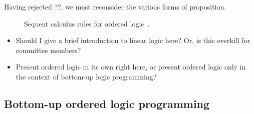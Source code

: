 Having rejected {??}, we must reconsider the various forms of proposition.


\begin{figure}
  \caption{Sequent calculus rules for ordered logic~\autocite{Polakow+Pfenning:MFPS99,Simmons:CMU12}.}
\end{figure}




\begin{itemize}
\item Should I give a brief introduction to linear logic here?  Or, is this overkill for committee members?
\item Present ordered logic in its own right here, or present ordered logic only in the context of bottom-up logic programming?
\end{itemize}

\subsection{Bottom-up ordered logic programming}\label{sec:ordered-lp}

